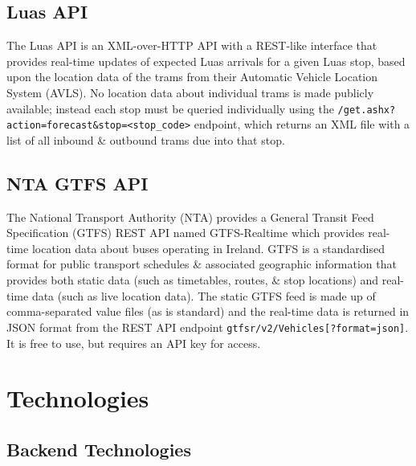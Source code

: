 \documentclass[a4paper,11pt]{report}
\begin{document}
\subsection{Luas API}
The Luas API\supercite{luasapi} is an XML-over-HTTP API with a REST-like interface that provides real-time updates of expected Luas arrivals for a given Luas stop, based upon the location data of the trams from their Automatic Vehicle Location System (AVLS).
No location data about individual trams is made publicly available;
instead each stop must be queried individually using the \verb|/get.ashx?action=forecast&stop=<stop_code>| endpoint, which returns an XML file with a list of all inbound \& outbound trams due into that stop.

\subsection{NTA GTFS API}
The National Transport Authority (NTA) provides a General Transit Feed Specification (GTFS)\supercite{gtfs} REST API named GTFS-Realtime\supercite{gtfsapi} which provides real-time location data about buses operating in Ireland.
GTFS is a standardised format for public transport schedules \& associated geographic information that provides both static data (such as timetables, routes, \& stop locations) and real-time data (such as live location data).
The static GTFS feed is made up of comma-separated value files (as is standard) and the real-time data is returned in JSON format from the REST API endpoint \verb|gtfsr/v2/Vehicles[?format=json]|.
It is free to use, but requires an API key for access.

\section{Technologies}
\subsection{Backend Technologies}
\end{document}
